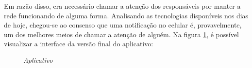 Em razão disso, era necessário chamar a atenção dos responsáveis por manter a rede funcionando de alguma forma. Analisando as tecnologias disponíveis nos dias de hoje, chegou-se ao consenso que uma notificação no celular é, provavelmente, um dos melhores meios de chamar a atenção de alguém. Na figura \ref{fig:aplicativo}, é possível visualizar a interface da versão final do aplicativo:

\begin{figure}[!htb]
    \centering
    \caption{\textit{Aplicativo}}
    \label{fig:aplicativo}
\end{figure}